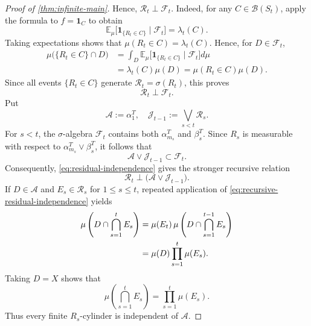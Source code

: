 \documentclass[12pt,letterpaper,reqno]{amsart}
\newcommand{\cB}{\mathcal B}
\newcommand{\cF}{\mathcal F}
\newcommand{\cR}{\mathcal R}
\theoremstyle{definition}
\theoremstyle{remark}
\numberwithin{equation}{section}
\begin{document}
\begin{proof}[Proof of \cref{thm:infinite-main}]
		Hence, $\cR_t\perp\cF_t$. Indeed, for any $C\in\cB(S_t)$, apply the formula to $f=\mathbf 1_C$ to obtain
		\[
		\mathbb E_\mu\bigl[
		\mathbf 1_{\{R_t\in C\}}\mid\cF_t
		\bigr]
		=
		\lambda_t(C).
		\]
		Taking expectations shows that $\mu(R_t\in C)=\lambda_t(C)$.  Hence, for
		$D\in\cF_t$,
		\[
		\begin{aligned}
			\mu\bigl(\{R_t\in C\}\cap D\bigr)
			&=
			\int_D\mathbb E_\mu\bigl[
			\mathbf 1_{\{R_t\in C\}}\mid\cF_t
			\bigr]d\mu\\
			&=
			\lambda_t(C)\mu(D)
			=
			\mu(R_t\in C)\mu(D).
		\end{aligned}
		\]
		Since all events $\{R_t\in C\}$ generate $\cR_t=\sigma(R_t)$, this proves
		\begin{equation}
			\cR_t\perp\cF_t.
			\label{eq:residual-independence}
		\end{equation}
	    Put
		\[
		\mathcal A:=\alpha_1^T,
		\quad
		\mathcal J_{t-1}:=\bigvee_{s<t}\mathcal R_s.
		\]
		For $s<t$, the $\sigma$-algebra $\cF_t$ contains both
		$\alpha_{m_s}^T$ and $\beta_s^T$.  Since $R_s$ is measurable with respect
		to $\alpha_{m_s}^T\vee\beta_s^T$, it follows that
		\[
		\mathcal A\vee\mathcal J_{t-1}
		\subset\mathcal F_t.
		\]
		Consequently, \eqref{eq:residual-independence} gives the stronger recursive
		relation
		\begin{equation}
			\mathcal R_t
			\perp
			\bigl(\mathcal A\vee\mathcal J_{t-1}\bigr).
			\label{eq:recursive-residual-independence}
		\end{equation}
		If $D\in\mathcal A$ and $E_s\in\mathcal R_s$ for $1\leq s\leq t$,
		repeated application of \eqref{eq:recursive-residual-independence} yields
		\begin{align}
			\mu\left(D\cap\bigcap_{s=1}^tE_s\right)
			&=
			\mu(E_t)\,
			\mu\left(D\cap\bigcap_{s=1}^{t-1}E_s\right)\notag\\
			&=
			\mu(D)\prod_{s=1}^t\mu(E_s).
			\label{eq:finite-residual-cylinder}
		\end{align}
		Taking $D=X$ shows that
		\[
		\mu\left(\bigcap_{s=1}^tE_s\right)
		=
		\prod_{s=1}^t\mu(E_s).
		\]
		Thus every finite $R_s$-cylinder is independent of $\mathcal A$.
		

\end{proof}
\end{document}
